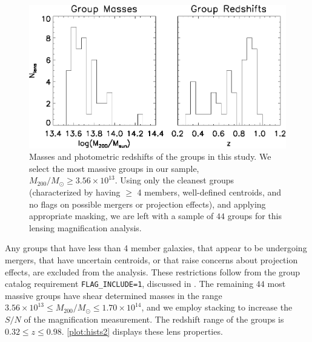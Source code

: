 \begin{figure}
\begin{center}
\includegraphics[scale=1.0]{plots_ch2/m200_zphot_histograms_44x.eps}
\caption[Masses and Redshifts of \ac{COSMOS} Groups]{Masses and photometric redshifts of the groups in this study.  We select the most massive groups in our sample, $M_{200} / M_\odot \ge 3.56 \times 10^{13}$. Using only the cleanest groups (characterized by having $\ge$ 4 members, well-defined centroids, and no flags on possible mergers or projection effects), and applying appropriate masking, we are left with a sample of $44$ groups for this lensing magnification analysis.}
\label{plot:hists2}
\end{center}
\end{figure}

Any groups that have less than 4 member galaxies, that appear to be undergoing mergers, that have uncertain centroids, or that raise concerns about projection effects, are excluded from the analysis. These restrictions follow from the group catalog requirement \texttt{FLAG\_INCLUDE=1}, discussed in \citet{George11}. The remaining $44$ most massive groups have shear determined masses in the range $ 3.56 \times 10^{13} \le M_{200} / M_\odot \le 1.70 \times 10^{14} $, and we employ stacking to increase the $S/N$ of the magnification measurement.  The redshift range of the groups is $ 0.32 \le z \le 0.98 $. \autoref{plot:hists2} displays these lens properties.

